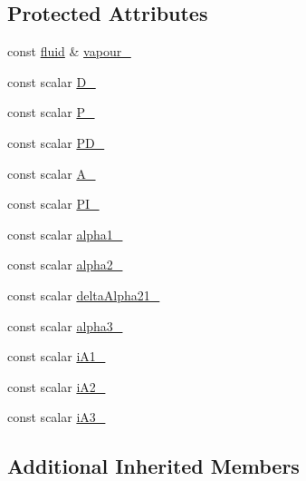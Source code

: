 \subsection*{Protected Attributes}
\begin{DoxyCompactItemize}
\item 
const \hyperlink{classFoam_1_1fluid}{fluid} \& \hyperlink{classFoam_1_1interfacialAreaModels_1_1Schor_a2675e35060f71c22823e4a0b3c816dad}{vapour\+\_\+}
\item 
const scalar \hyperlink{classFoam_1_1interfacialAreaModels_1_1Schor_ac5178eaceca14c37903e56d8a8bff07c}{D\+\_\+}
\item 
const scalar \hyperlink{classFoam_1_1interfacialAreaModels_1_1Schor_a10357e8c1e678a03659e6c29f2c6df11}{P\+\_\+}
\item 
const scalar \hyperlink{classFoam_1_1interfacialAreaModels_1_1Schor_a5729850f00382b69f3383767af2113dc}{P\+D\+\_\+}
\item 
const scalar \hyperlink{classFoam_1_1interfacialAreaModels_1_1Schor_a964d35f7a0122b4371643835f79989e6}{A\+\_\+}
\item 
const scalar \hyperlink{classFoam_1_1interfacialAreaModels_1_1Schor_ac6b9a29799300aa157cd8e37b0eb3659}{P\+I\+\_\+}
\item 
const scalar \hyperlink{classFoam_1_1interfacialAreaModels_1_1Schor_a5a3e8ad8bfd8a6a6e360247a544f194b}{alpha1\+\_\+}
\item 
const scalar \hyperlink{classFoam_1_1interfacialAreaModels_1_1Schor_a02141f9077e75434711df7291b216696}{alpha2\+\_\+}
\item 
const scalar \hyperlink{classFoam_1_1interfacialAreaModels_1_1Schor_a87a2f9b83009433966ec99be39cfe860}{delta\+Alpha21\+\_\+}
\item 
const scalar \hyperlink{classFoam_1_1interfacialAreaModels_1_1Schor_acae046e249a3d74d1ab3d0dfa7ab71e1}{alpha3\+\_\+}
\item 
const scalar \hyperlink{classFoam_1_1interfacialAreaModels_1_1Schor_a9174675049b3cd3ad34e63536342f619}{i\+A1\+\_\+}
\item 
const scalar \hyperlink{classFoam_1_1interfacialAreaModels_1_1Schor_a9e7731b181b3004e1514d4a74755989d}{i\+A2\+\_\+}
\item 
const scalar \hyperlink{classFoam_1_1interfacialAreaModels_1_1Schor_a9a5bb66a7e6b7f8a3ecffa23b651446b}{i\+A3\+\_\+}
\end{DoxyCompactItemize}
\subsection*{Additional Inherited Members}


